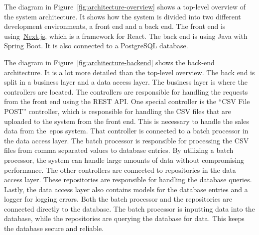 The diagram in Figure~\ref{fig:architecture-overview} shows a top-level overview of the system architecture.
It shows how the system is divided into two different development environments, a front end and a back end.
The front end is using~\url{Next.js}, which is a framework for React.
The back end is using Java with Spring Boot.
It is also connected to a PostgreSQL database.

The diagram in Figure~\ref{fig:architecture-backend} shows the back-end architecture.
It is a lot more detailed than the top-level overview.
The back end is split in a business layer and a data access layer.
The business layer is where the controllers are located.
The controllers are responsible for handling the requests from the front end using the REST API.\@
One special controller is the ``CSV File POST'' controller, which is responsible for handling the CSV files that
are uploaded to the system from the front end.
This is necessary to handle the sales data from the~\acrshort{epos} system.
That controller is connected to a batch processor in the data access layer.
The batch processor is responsible for processing the CSV files from comma separated values to database entries.
By utilizing a batch processor, the system can handle large amounts of data without compromising performance.
The other controllers are connected to repositories in the data access layer.
These repositories are responsible for handling the database queries.
Lastly, the data access layer also contains models for the database entries and a logger for logging errors.
Both the batch processor and the repositories are connected directly to the database.
The batch processor is inputting data into the database, while the repositories are querying the database for data.
This keeps the database secure and reliable.
